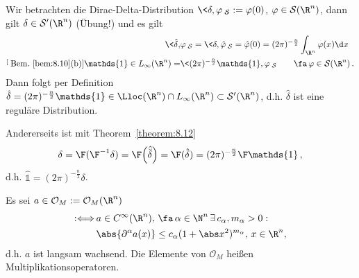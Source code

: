 \begin{bsp}
  \label{bsp:8.13}
  Wir betrachten die Dirac-Delta-Distribution $\<\delta, \varphi\>_{\mathcal S} := \varphi (0)$, $\varphi \in \mathcal S(\R^n)$, dann gilt $\delta \in \mathcal S'(\R^n)$ (Übung!) und es gilt
  \begin{align*}
  	\< \hat\delta, &\varphi \>_{\mathcal S}  = \< \delta, \hat\varphi\>_{\mathcal S} =\hat\varphi (0) = (2\pi)^{-\frac n2} \int_{\R^n} \varphi(x) \d x \\
	 \stackrel[\scriptsize\text{Bem.}~\ref{bem:8.10} \text{(b)}]{\mathds{1}\in L_\infty (\R^n)}= & \< (2\pi)^{-\frac n2} \mathds{1}, \varphi\>_{\mathcal S} \qquad \fa \, \varphi \in \mathcal S(\R^n) \,.
  \end{align*}
  Dann folgt per Definition $\hat\delta = (2\pi)^{-\frac n2} \mathds{1} \in \Lloc (\R^n) \cap L_\infty (\R^n) \subset \mathcal S'(\R^n)$, d.h. $\hat\delta$ ist eine reguläre Distribution.
  
  Andererseits ist mit Theorem~\ref{theorem:8.12}
  \begin{align*}
  	\delta = \F (\F^{-1} \delta) = \F\Big( \hat{\breve\delta}\Big) = \F(\hat\delta) = (2\pi)^{-\frac n2} \F \mathds{1} \, , 
  \end{align*}
  d.h. $\hat{\mathds{1}} = (2\pi)^{-\frac n2}\delta$.
\end{bsp}

\begin{defi}
Es sei $a \in \mathcal O_M := \mathcal O_M(\R^n)$
\begin{align*}
	:\Longleftrightarrow \, & a \in C^\infty (\R^n), \, \fa \, \alpha\in\N^n \, \exists \, c_\alpha, m_\alpha > 0: \\ & \abs{\partial^\alpha a(x)} \leq c_\alpha (1+\abs x^2)^{m_\alpha} , \, x \in \R^n, 
\end{align*}
d.h. $a$ ist langsam wachsend. Die Elemente von $\mathcal O_M$ heißen Multiplikationsoperatoren.
\end{defi}



